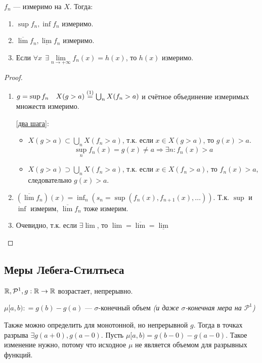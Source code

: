 \begin{theorem}
    \(f_n\) --- измеримо на \(X\). Тогда:
    \begin{enumerate}
        \item \(\sup f_n, \inf f_n\) измеримо.
        \item \(\overline \lim f_n, \underline \lim f_n\) измеримо.
        \item Если \(\forall x \ \ \exists \lim\limits_{n \to +\infty} f_n(x) = h(x)\), то \(h(x)\) измеримо.
    \end{enumerate}
\end{theorem}
\begin{proof}\itemfix
    \begin{enumerate}
        \item \(g = \sup f_n \quad X(g > a) \symrefeq{два шага} \bigcup_n X(f_n > a)\) и счётное объединение измеримых множеств измеримо.

              \ref{два шага}: \begin{itemize}
                  \item \(X(g > a) \subset \bigcup_n X(f_n > a)\), т.к. если \(x\in X(g > a)\), то \(g(x) > a\).
                        \[\sup_n f_n(x) = g(x) \neq a \Rightarrow \exists n : f_n(x) > a\]
                  \item \(X(g > a) \supset \bigcup_n X(f_n > a)\), т.к. если \(x\in X(f_n > a)\), то \(f_n(x) > a\), следовательно \(g(x) > a\).
              \end{itemize}

        \item \((\overline \lim f_n)(x) = \inf_n (s_n = \sup (f_n(x), f_{n+1}(x), \dots )) \). Т.к. \(\sup\) и \(\inf\) измерим, \(\overline \lim f_n\) тоже измерим.
        \item Очевидно, т.к. если \(\exists \lim\), то \(\lim = \overline \lim = \underline \lim\)
    \end{enumerate}
\end{proof}

\subsection*{Меры Лебега-Стилтьеса}

\(\mathbb{R}, \mathcal{P}^1, g : \mathbb{R} \to \mathbb{R}\) возрастает, непрерывно.

\(\mu[a, b) : = g(b) - g(a)\) --- \(\sigma\)-конечный объем \textit{(и даже \(\sigma\)-конечная мера на \(\mathcal{P}^1\))}

Также можно определить для монотонной, но непрерывной \(g\). Тогда в точках разрыва \(\exists g(a + 0), g(a - 0)\). Пусть \(\mu[a, b) = g(b - 0) - g(a - 0)\). Такое изменение нужно, потому что исходное \(\mu\) не является объемом для разрывных функций.

